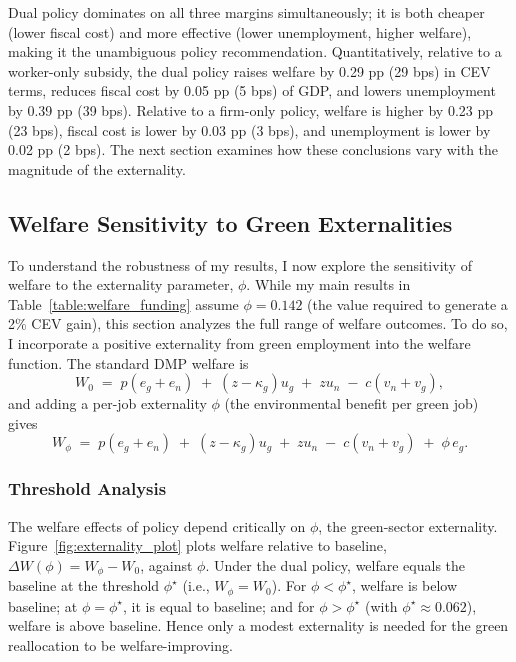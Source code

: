 \documentclass[preprint,12pt]{elsarticle}
\begin{document}
\noindent Dual policy dominates on all three margins simultaneously; it is both cheaper (lower fiscal cost) and more effective (lower unemployment, higher welfare), making it the unambiguous policy recommendation. Quantitatively, relative to a worker-only subsidy, the dual policy raises welfare by 0.29 pp (29 bps) in CEV terms, reduces fiscal cost by 0.05 pp (5 bps) of GDP, and lowers unemployment by 0.39 pp (39 bps). Relative to a firm-only policy, welfare is higher by 0.23 pp (23 bps), fiscal cost is lower by 0.03 pp (3 bps), and unemployment is lower by 0.02 pp (2 bps). The next section examines how these conclusions vary with the magnitude of the externality. 


\subsection{Welfare Sensitivity to Green Externalities}
\label{sec:welfare_sensitivity}

To understand the robustness of my results, I now explore the sensitivity of welfare to the externality parameter, $\phi$. While my main results in Table~\ref{table:welfare_funding} assume $\phi = 0.142$ (the value required to generate a 2\% CEV gain), this section analyzes the full range of welfare outcomes. To do so, I incorporate a positive externality from green employment into the welfare function. The standard DMP welfare is
\[
W_0 \;=\; p(e_g+e_n) \;+\; (z-\kappa_g)u_g \;+\; z u_n \;-\; c(v_n+v_g),
\]
and adding a per-job externality $\phi$ (the environmental benefit per green job) gives
\[
W_\phi \;=\; p(e_g+e_n) \;+\; (z-\kappa_g)u_g \;+\; z u_n \;-\; c(v_n+v_g) \;+\; \phi\, e_g.
\]

\subsubsection{Threshold Analysis}

The welfare effects of policy depend critically on \(\phi\), the green-sector externality. Figure~\ref{fig:externality_plot} plots welfare relative to baseline, \(\Delta W(\phi)=W_\phi-W_0\), against \(\phi\). Under the dual policy, welfare equals the baseline at the threshold \(\phi^\star\) (i.e., \(W_\phi=W_0\)). For \(\phi<\phi^\star\), welfare is below baseline; at \(\phi=\phi^\star\), it is equal to baseline; and for \(\phi>\phi^\star\) (with \(\phi^\star\approx 0.062\)), welfare is above baseline. Hence only a modest externality is needed for the green reallocation to be welfare-improving.
\end{document}
